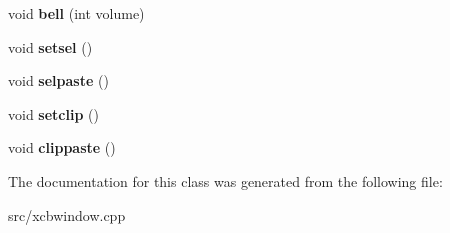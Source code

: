 \begin{DoxyCompactItemize}
void {\bfseries bell} (int volume)
\item 
\mbox{\label{classXcbWindow_a0556df0c825ffe4c750293716cc988a6}} 
void {\bfseries setsel} ()
\item 
\mbox{\label{classXcbWindow_a6d026425b6024a932b440feaa91b4d0a}} 
void {\bfseries selpaste} ()
\item 
\mbox{\label{classXcbWindow_abff03082ef36ce25368bb96de3cdca3e}} 
void {\bfseries setclip} ()
\item 
\mbox{\label{classXcbWindow_a755b74287cc999b3f2f30d5918bc264f}} 
void {\bfseries clippaste} ()
\end{DoxyCompactItemize}


The documentation for this class was generated from the following file\+:\begin{DoxyCompactItemize}
\item 
src/xcbwindow.\+cpp\end{DoxyCompactItemize}

